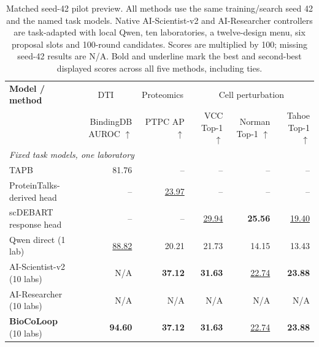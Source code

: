 \begin{table}[t]
\centering\footnotesize
\setlength{\tabcolsep}{3pt}
\renewcommand{\arraystretch}{1.12}
\begin{tabularx}{\linewidth}{@{}Xrrrrr@{}}
\toprule
\textbf{Model / method} & \multicolumn{1}{c}{DTI} & \multicolumn{1}{c}{Proteomics} & \multicolumn{3}{c}{Cell perturbation} \\
\cmidrule(lr){2-2}\cmidrule(lr){3-3}\cmidrule(l){4-6}
 & \shortstack{BindingDB\\AUROC $\uparrow$} & \shortstack{PTPC\\AP $\uparrow$} & \shortstack{VCC\\Top-1 $\uparrow$} & \shortstack{Norman\\Top-1 $\uparrow$} & \shortstack{Tahoe\\Top-1 $\uparrow$} \\
\midrule
\multicolumn{6}{l}{\textit{Fixed task models, one laboratory}} \\
TAPB & 81.76 & -- & -- & -- & -- \\
ProteinTalks-derived head & -- & \underline{23.97} & -- & -- & -- \\
scDEBART response head & -- & -- & \underline{29.94} & \textbf{25.56} & \underline{19.40} \\
\midrule
Qwen direct (1 lab) & \underline{88.82} & 20.21 & 21.73 & 14.15 & 13.43 \\
AI-Scientist-v2 (10 labs) & N/A & \textbf{37.12} & \textbf{31.63} & \underline{22.74} & \textbf{23.88} \\
AI-Researcher (10 labs) & N/A & N/A & N/A & N/A & N/A \\
\textbf{BioCoLoop} (10 labs) & \textbf{94.60} & \textbf{37.12} & \textbf{31.63} & \underline{22.74} & \textbf{23.88} \\
\bottomrule
\end{tabularx}
\caption{Matched seed-42 pilot preview. All methods use the same training/search seed 42 and the named task models. Native AI-Scientist-v2 and AI-Researcher controllers are task-adapted with local Qwen, ten laboratories, a twelve-design menu, six proposal slots and 100-round candidates. Scores are multiplied by 100; missing seed-42 results are N/A. Bold and underline mark the best and second-best displayed scores across all five methods, including ties.}
\label{tab:public-harness-seed42-preview}
\end{table}
